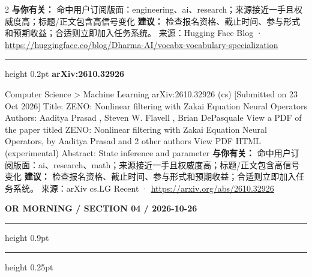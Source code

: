 \documentclass[10.5pt]{ctexart}
\begin{document}
\begin{multicols}{2}
\textbf{与你有关：} 命中用户订阅版面：engineering、ai、research；来源接近一手且权威度高；标题/正文包含高信号变化
\textbf{建议：} 检查报名资格、截止时间、参与形式和预期收益；合适则立即加入任务系统。
{\footnotesize\color{ormuted} 来源：Hugging Face Blog · \url{https://huggingface.co/blog/Dharma-AI/vocabx-vocabulary-specialization}}
\vspace{2mm}
\hrule height 0.2pt
\vspace{2mm}
{\large\bfseries arXiv:2610.32926}\par
Computer Science > Machine Learning arXiv:2610.32926 (cs) [Submitted on 23 Oct 2026] Title: ZENO: Nonlinear filtering with Zakai Equation Neural Operators Authors: Aaditya Prasad , Steven W. Flavell , Brian DePasquale View a PDF of the paper titled ZENO: Nonlinear filtering with Zakai Equation Neural Operators, by Aaditya Prasad and 2 other authors View PDF HTML (experimental) Abstract: State inference and parameter 
\textbf{与你有关：} 命中用户订阅版面：ai、research、math；来源接近一手且权威度高；标题/正文包含高信号变化
\textbf{建议：} 检查报名资格、截止时间、参与形式和预期收益；合适则立即加入任务系统。
{\footnotesize\color{ormuted} 来源：arXiv cs.LG Recent · \url{https://arxiv.org/abs/2610.32926}}
\end{multicols}
\newpage
{\small\bfseries OR MORNING / SECTION 04 / 2026-10-26}
\vspace{2mm}
\hrule height 0.9pt
\vspace{1.5mm}
\hrule height 0.25pt
\vspace{4mm}
\end{document}
